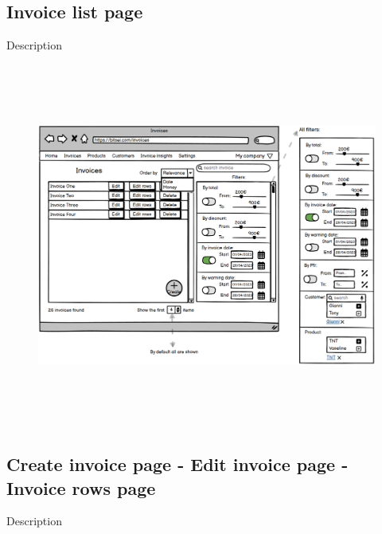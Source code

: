 \subsection{Invoice list page}

Description

\begin{figure}[h!]
    \centering
    \includegraphics[height=340pt, keepaspectratio]{resources/mockup/Invoice_list.png}
\end{figure}
\newpage
\subsection{Create invoice page - Edit invoice page - Invoice rows page}

Description

